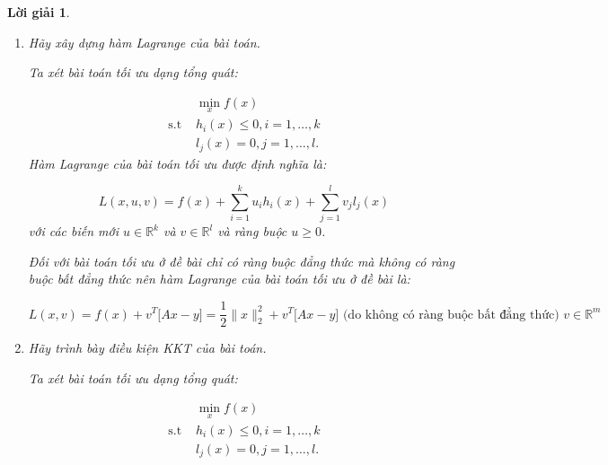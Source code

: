 \documentclass[14pt, a4paper]{article}
\theoremstyle{sltheorem}
\theoremstyle{soltheorem}
\newtheorem*{loigiai}{Lời giải}
\begin{document}
\begin{loigiai}
\begin{enumerate} [wide, labelwidth=!, labelindent=0pt,label=\textbf{\arabic*}.]
            Vì $dom(f)$ là tập lồi và $\nabla^2 f(x) \succeq 0$ nên $f(x)=\dfrac{1}{2} \lVert x \rVert_2^2$ là một hàm lồi.
            Bài toán tối ưu hóa trên có $f(x)$ là hàm lồi, không có ràng buộc bất đẳng thức và ràng buộc đẳng thức $Ax=y$ là hàm affine.
            Vì vậy bài toán tối ưu trên là một bài toán lồi.

            \item Hãy xây dựng hàm Lagrange của bài toán.
            
            Ta xét bài toán tối ưu dạng tổng quát:

            \begin{equation*}
                \begin{aligned}
                    & \min_x f(x) \\
                     \text{s.t } & h_i(x) \leq 0, i = 1, \dots, k \\
                    & l_j(x) = 0, j = 1, \dots, l.
                \end{aligned}
            \end{equation*}
            Hàm Lagrange của bài toán tối ưu được định nghĩa là:

            \begin{equation*}
                L(x, u, v) = f(x) + \sum_{i=1}^k u_i h_i(x) + \sum_{j=1}^l v_j l_j (x)
            \end{equation*}
            với các biến mới $u \in \mathbb{R}^k$ và $v \in \mathbb{R}^l$ và ràng buộc $u \geq 0$.

            Đối với bài toán tối ưu ở đề bài chỉ có ràng buộc đẳng thức mà không có ràng buộc bất đẳng thức nên hàm Lagrange của bài toán tối ưu ở đề bài là:

            \begin{equation*}
                L(x, v)=f(x) + v^T\Big \lbrack Ax - y \Big \rbrack=\dfrac{1}{2}\lVert x \rVert_2^2 + v^T \Big \lbrack Ax - y \Big \rbrack \text{ (do không có ràng buộc bất đẳng thức) } v \in \mathbb{R}^m
            \end{equation*}

            \item Hãy trình bày điều kiện KKT của bài toán.
            
            Ta xét bài toán tối ưu dạng tổng quát:

            \begin{equation*}
                \begin{aligned}
                    & \min_x f(x) \\
                     \text{s.t } & h_i(x) \leq 0, i = 1, \dots, k \\
                    & l_j(x) = 0, j = 1, \dots, l.
                \end{aligned}
            \end{equation*}


\end{enumerate}
\end{loigiai}
\end{document}
